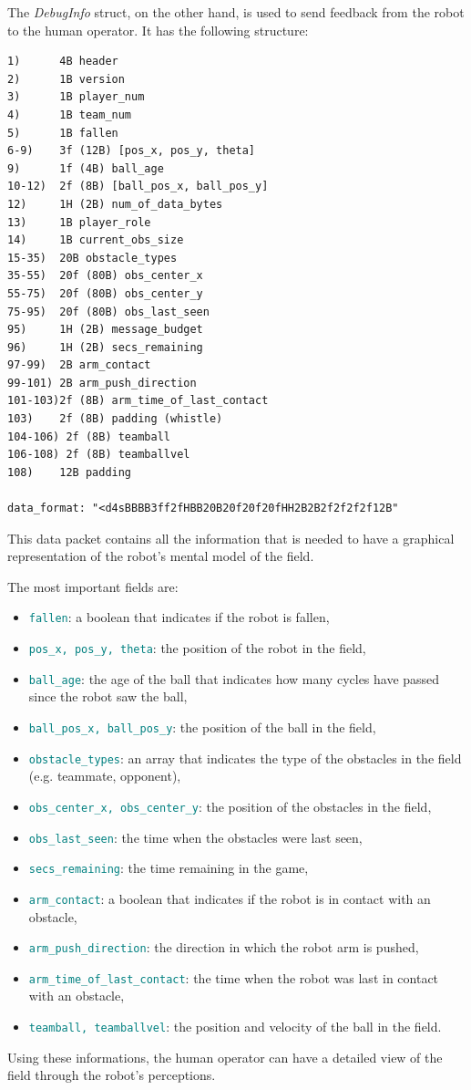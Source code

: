 \documentclass[a4paper, onecolumn, 12pt]{article}
\newcommand\code[1]{\textcolor{teal}{\texttt{#1}}}
\begin{document}
The \textit{DebugInfo} struct, on the other hand, is used to send feedback from
the robot to the human operator. It has the following structure:

\begin{verbatim}
1)      4B header
2)      1B version
3)      1B player_num
4)      1B team_num
5)      1B fallen
6-9)    3f (12B) [pos_x, pos_y, theta]
9)      1f (4B) ball_age
10-12)  2f (8B) [ball_pos_x, ball_pos_y]
12)     1H (2B) num_of_data_bytes
13)     1B player_role
14)     1B current_obs_size
15-35)  20B obstacle_types  
35-55)  20f (80B) obs_center_x
55-75)  20f (80B) obs_center_y
75-95)  20f (80B) obs_last_seen
95)     1H (2B) message_budget
96)     1H (2B) secs_remaining
97-99)  2B arm_contact
99-101) 2B arm_push_direction
101-103)2f (8B) arm_time_of_last_contact
103)    2f (8B) padding (whistle)
104-106) 2f (8B) teamball
106-108) 2f (8B) teamballvel
108)    12B padding

data_format: "<d4sBBBB3ff2fHBB20B20f20f20fHH2B2B2f2f2f2f12B"
\end{verbatim}

This data packet contains all the information that is needed to have a graphical
representation of the robot's mental model of the field.

The most important fields are:
\begin{itemize}
    \item \code{fallen}: a boolean that indicates if the robot is fallen,
    \item \code{pos\_x, pos\_y, theta}: the position of the robot in the field,
    \item \code{ball\_age}: the age of the ball that indicates how many cycles have passed since the robot saw the ball,
    \item \code{ball\_pos\_x, ball\_pos\_y}: the position of the ball in the field,
    \item \code{obstacle\_types}: an array that indicates the type of the obstacles in the field (e.g. teammate, opponent),
    \item \code{obs\_center\_x, obs\_center\_y}: the position of the obstacles in the field,
    \item \code{obs\_last\_seen}: the time when the obstacles were last seen,
    \item \code{secs\_remaining}: the time remaining in the game,
    \item \code{arm\_contact}: a boolean that indicates if the robot is in contact with an obstacle,
    \item \code{arm\_push\_direction}: the direction in which the robot arm is pushed,
    \item \code{arm\_time\_of\_last\_contact}: the time when the robot was last in contact with an obstacle,
    \item \code{teamball, teamballvel}: the position and velocity of the ball in the field.
\end{itemize}
Using these informations, the human operator can have a detailed view of the field through the robot's perceptions.
\end{document}
